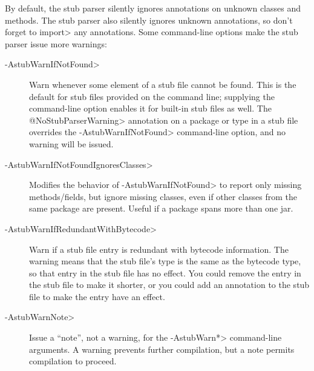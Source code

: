 By default, the stub parser silently ignores
annotations on unknown classes and methods.
The stub parser also silently ignores unknown annotations, so don't forget to
\<import> any annotations.
Some command-line options make the stub parser issue more warnings:

\begin{description}
\item[\<-AstubWarnIfNotFound>]
  Warn whenever some element of a stub file cannot be found.
  This is the default for stub files provided on the command line;
  supplying the command-line option enables it for built-in stub files as well.
  The \<@NoStubParserWarning> annotation on a package or type in a stub file
  overrides the \<-AstubWarnIfNotFound> command-line option, and no warning
  will be issued.


\item[\<-AstubWarnIfNotFoundIgnoresClasses>]
  Modifies the behavior of \<-AstubWarnIfNotFound>
  to report only missing methods/fields, but ignore missing classes, even if
  other classes from the same package are present.
  Useful if a package spans more than one jar.

\item[\<-AstubWarnIfRedundantWithBytecode>]
  Warn if a stub file entry is redundant with bytecode information.  The
  warning means that the stub file's type is the same as the bytecode type,
  so that entry in the stub file has no effect.  You could remove the
  entry in the stub file to make it shorter, or you could add an annotation
  to the stub file to make the entry have an effect.


\item[\<-AstubWarnNote>]
  Issue a ``note'', not a warning, for the \<-AstubWarn*> command-line
  arguments.  A warning prevents further compilation, but a note permits
  compilation to proceed.

\end{description}

